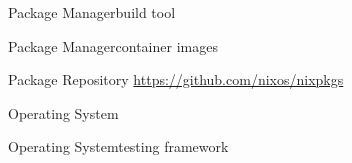 \documentclass{beamer}
\begin{document}
\begin{frame}{Package Manager}{build tool}
	
\end{frame}

\begin{frame}{Package Manager}{container images}
	
\end{frame}

\begin{frame}{Package Repository}
	\url{https://github.com/nixos/nixpkgs}
\end{frame}

\begin{frame}{Operating System}
\end{frame}

\begin{frame}{Operating System}{testing framework}
\end{frame}
\end{document}
